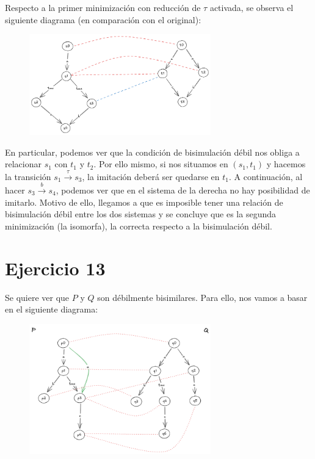\documentclass{article}
\begin{document}
Respecto a la primer minimización con reducción de $\tau$ activada, se observa el siguiente diagrama (en comparación con el original):
\begin{figure}[!htb]
	\includegraphics[width=0.7\textwidth]{02-12.png}
	\centering
\end{figure}

En particular, podemos ver que la condición de bisimulación débil nos obliga a relacionar $s_1$ con $t_1$ y $t_2$.
Por ello mismo, si nos situamos en $(s_1, t_1)$ y hacemos la transición $s_1 \overset{\tau}{\to} s_3$, la imitación deberá ser quedarse en $t_1$.
A continuación, al hacer $s_3 \overset{b}{\to} s_4$, podemos ver que en el sistema de la derecha no hay posibilidad de imitarlo.
Motivo de ello, llegamos a que es imposible tener una relación de bisimulación débil entre los dos sistemas y se concluye que es la segunda minimización (la isomorfa), la correcta respecto a la bisimulación débil.

\pagebreak
\section*{Ejercicio 13}
Se quiere ver que $P$ y $Q$ son débilmente bisimilares.
Para ello, nos vamos a basar en el siguiente diagrama:
\begin{figure}[!htb]
	\includegraphics[width=0.7\textwidth]{02-13.png}
	\centering
\end{figure}
\end{document}
